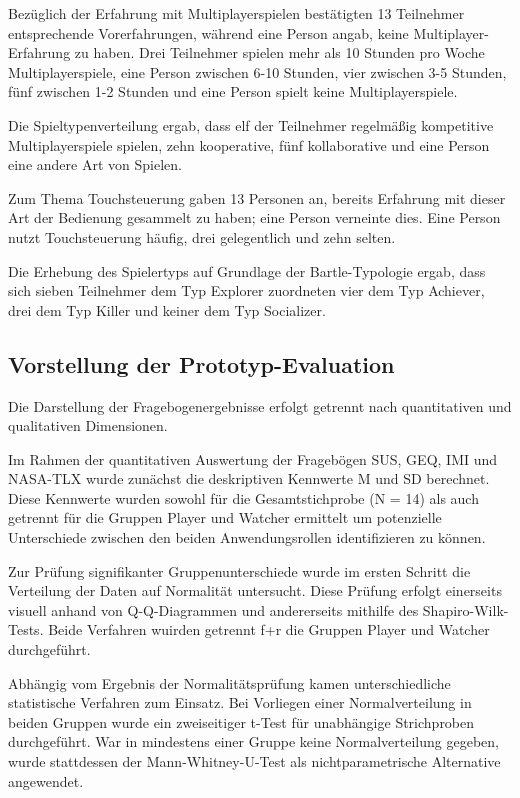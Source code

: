 Bezüglich der Erfahrung mit Multiplayerspielen bestätigten 13 Teilnehmer entsprechende Vorerfahrungen, während eine Person angab, keine Multiplayer-Erfahrung zu haben. Drei Teilnehmer spielen mehr als 10 Stunden pro Woche Multiplayerspiele, eine Person zwischen 6-10 Stunden, vier zwischen 3-5 Stunden, fünf zwischen 1-2 Stunden und eine Person spielt keine Multiplayerspiele.

Die Spieltypenverteilung ergab, dass elf der Teilnehmer regelmäßig kompetitive Multiplayerspiele spielen, zehn kooperative, fünf kollaborative und eine Person eine andere Art von Spielen.

Zum Thema Touchsteuerung gaben 13 Personen an, bereits Erfahrung mit dieser Art der Bedienung gesammelt zu haben; eine Person verneinte dies. Eine Person nutzt Touchsteuerung häufig, drei gelegentlich und zehn selten.

Die Erhebung des Spielertyps auf Grundlage der Bartle-Typologie ergab, dass sich sieben Teilnehmer dem Typ Explorer zuordneten vier dem Typ Achiever, drei dem Typ Killer und keiner dem Typ Socializer.

\subsection{Vorstellung der Prototyp-Evaluation}

Die Darstellung der Fragebogenergebnisse erfolgt getrennt nach quantitativen und qualitativen Dimensionen.

Im Rahmen der quantitativen Auswertung der Fragebögen  \ac{SUS}, \ac{GEQ}, \ac{IMI} und \ac{NASA-TLX} wurde zunächst die deskriptiven Kennwerte \ac{M} und \ac{SD} berechnet. Diese Kennwerte wurden sowohl für die Gesamtstichprobe (N = 14) als auch getrennt für die Gruppen Player und Watcher ermittelt um potenzielle Unterschiede zwischen den beiden Anwendungsrollen identifizieren zu können.

Zur Prüfung signifikanter Gruppenunterschiede wurde im ersten Schritt die Verteilung der Daten auf Normalität untersucht. Diese Prüfung erfolgt einerseits visuell anhand von \ac{Q-Q}-Diagrammen und andererseits mithilfe des Shapiro-Wilk-Tests. Beide Verfahren wuirden getrennt f+r die Gruppen Player und Watcher durchgeführt.

Abhängig vom Ergebnis der Normalitätsprüfung kamen unterschiedliche statistische Verfahren zum Einsatz. Bei Vorliegen einer Normalverteilung in beiden Gruppen wurde ein zweiseitiger t-Test für unabhängige Strichproben durchgeführt. War in mindestens einer Gruppe keine Normalverteilung gegeben, wurde stattdessen der Mann-Whitney-U-Test als nichtparametrische Alternative angewendet.


